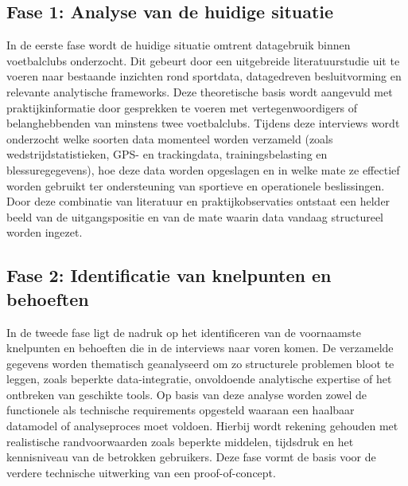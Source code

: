 \subsection*{Fase 1: Analyse van de huidige situatie}
In de eerste fase wordt de huidige situatie omtrent datagebruik binnen voetbalclubs onderzocht.
Dit gebeurt door een uitgebreide literatuurstudie uit te voeren naar bestaande inzichten rond sportdata, datagedreven besluitvorming en relevante analytische frameworks.
Deze theoretische basis wordt aangevuld met praktijkinformatie door gesprekken te voeren met vertegenwoordigers of belanghebbenden van minstens twee voetbalclubs.
Tijdens deze interviews wordt onderzocht welke soorten data momenteel worden verzameld (zoals wedstrijdstatistieken, GPS- en trackingdata, trainingsbelasting en blessuregegevens), hoe deze data worden opgeslagen en in welke mate ze effectief worden gebruikt ter ondersteuning van sportieve en operationele beslissingen.
Door deze combinatie van literatuur en praktijkobservaties ontstaat een helder beeld van de uitgangspositie en van de mate waarin data vandaag structureel worden ingezet.

\subsection*{Fase 2: Identificatie van knelpunten en behoeften}
In de tweede fase ligt de nadruk op het identificeren van de voornaamste knelpunten en behoeften die in de interviews naar voren komen.
De verzamelde gegevens worden thematisch geanalyseerd om zo structurele problemen bloot te leggen, zoals beperkte data-integratie, onvoldoende analytische expertise of het ontbreken van geschikte tools.
Op basis van deze analyse worden zowel de functionele als technische requirements opgesteld waaraan een haalbaar datamodel of analyseproces moet voldoen.
Hierbij wordt rekening gehouden met realistische randvoorwaarden zoals beperkte middelen, tijdsdruk en het kennisniveau van de betrokken gebruikers.
Deze fase vormt de basis voor de verdere technische uitwerking van een proof-of-concept.

